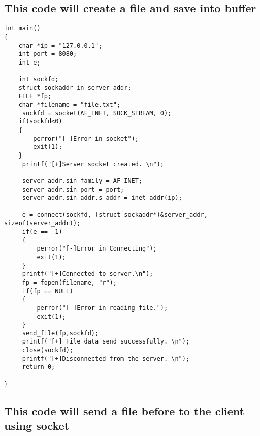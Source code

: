 \documentclass{article}
\begin{document}
\subsection{This code will create a file and save into buffer}
\begin{lstlisting}
int main()
{
    char *ip = "127.0.0.1";
    int port = 8080;
    int e;

    int sockfd;
    struct sockaddr_in server_addr;
    FILE *fp;
    char *filename = "file.txt";
     sockfd = socket(AF_INET, SOCK_STREAM, 0);
    if(sockfd<0)
    {
        perror("[-]Error in socket");
        exit(1);
    }
     printf("[+]Server socket created. \n");

     server_addr.sin_family = AF_INET;
     server_addr.sin_port = port;
     server_addr.sin_addr.s_addr = inet_addr(ip);

     e = connect(sockfd, (struct sockaddr*)&server_addr, sizeof(server_addr));
     if(e == -1)
     {
         perror("[-]Error in Connecting");
         exit(1);
     }
     printf("[+]Connected to server.\n");
     fp = fopen(filename, "r");
     if(fp == NULL)
     {
         perror("[-]Error in reading file.");
         exit(1);
     }
     send_file(fp,sockfd);
     printf("[+] File data send successfully. \n");
     close(sockfd);
     printf("[+]Disconnected from the server. \n");
     return 0;

}
\end{lstlisting}
\subsection{This code will send a file before to the client using socket}
\end{document}
